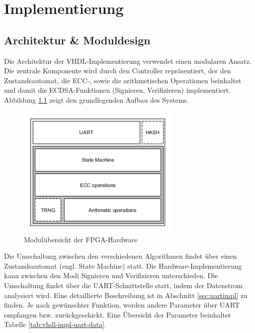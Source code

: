 
\chapter{Implementierung} \label{sec:impl}

\section{Architektur \& Moduldesign} 
\label{sec:march}
Die Architektur der VHDL-Implementierung verwendet einen modularen Ansatz. Die zentrale Komponente wird durch den Controller repräsentiert, der den Zustandsautomat, die ECC-, sowie die arithmetischen Operationen beinhaltet und damit die ECDSA-Funktionen (Signieren, Verifizieren)  implementiert. Abbildung \ref{fig:vhdl-impl-arch} zeigt den grundlegenden Aufbau des Systems.   

\begin{figure}[H]
	\centering
  	\includegraphics[width=0.7\textwidth]{bilder/vhdl_overview.png}
	\caption{Modulübersicht der FPGA-Hardware}
	\label{fig:vhdl-impl-arch}
\end{figure}
 
Die Umschaltung zwischen den verschiedenen Algorithmen findet über einen Zustandsautomat (engl. State Machine) statt. Die Hardware-Implementierung kann zwischen den Modi Signieren und Verifizieren unterschieden. Die Umschaltung findet über die UART-Schnittstelle statt, indem der Datenstrom analysiert wird. Eine detaillierte Beschreibung ist in Abschnitt \ref{sec:uartimpl} zu finden. Je nach gewünschter Funktion, werden andere Parameter über UART empfangen bzw. zurückgeschickt. Eine Übersicht der Parameter beinhaltet Tabelle \ref{tab:vhdl-impl-uart-data}. \\

